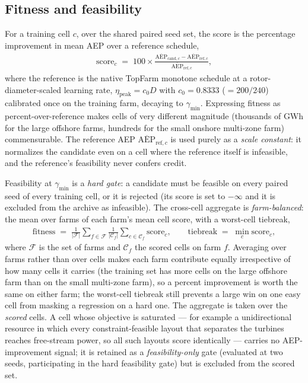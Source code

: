 \documentclass[11pt]{article}
\newcommand{\gm}{\gamma_{\min}}
\newcommand{\aep}{\mathrm{AEP}}
\begin{document}
\subsection{Fitness and feasibility}
\label{sec:fitness}
For a training cell $c$, over the shared paired seed set, the score is the percentage
improvement in mean AEP over a reference schedule,
\begin{align}
\text{score}_c \;=\; 100\times
\frac{\overline{\aep}_{\text{cand},c}-\overline{\aep}_{\text{ref},c}}{\overline{\aep}_{\text{ref},c}},
\label{eq:score}
\end{align}
where the reference is the native TopFarm monotone schedule at a rotor-diameter-scaled
learning rate, $\eta_{\text{peak}}=c_0 D$ with $c_0=0.8333$ ($=200/240$) calibrated once
on the training farm, decaying to $\gm$. Expressing fitness as percent-over-reference makes cells of
very different magnitude (thousands of GWh for the large offshore farms, hundreds for
the small onshore multi-zone farm) commensurable. The reference AEP
$\overline{\aep}_{\text{ref},c}$ is used purely as a \emph{scale constant}: it
normalizes the candidate even on a cell where the reference itself is infeasible, and
the reference's feasibility never confers credit.

Feasibility at $\gm$ is a \emph{hard gate}: a candidate must be feasible on every
paired seed of every training cell, or it is rejected (its score is set to $-\infty$
and it is excluded from the archive as infeasible). The cross-cell aggregate is
\emph{farm-balanced}: the mean over farms of each farm's mean cell score, with a
worst-cell tiebreak,
\begin{align}
\text{fitness} \;=\;
\frac{1}{|\mathcal{F}|}\sum_{f\in\mathcal{F}}
\frac{1}{|\mathcal{C}_f|}\sum_{c\in\mathcal{C}_f}\text{score}_c,
\qquad
\text{tiebreak} \;=\; \min_{c}\text{score}_c,
\label{eq:agg}
\end{align}
where $\mathcal{F}$ is the set of farms and $\mathcal{C}_f$ the scored cells on farm
$f$. Averaging over farms rather than over cells makes each farm contribute equally
irrespective of how many cells it carries (the training set has more cells on the
large offshore farm than on the small multi-zone farm), so a percent improvement is
worth the same on either farm; the worst-cell tiebreak still prevents a large win on
one easy cell from masking a regression on a hard one. The aggregate is taken over the
\emph{scored} cells. A cell whose objective is saturated --- for example a
unidirectional resource in which every constraint-feasible layout that separates the
turbines reaches free-stream power, so all such layouts score identically --- carries
no AEP-improvement signal; it is retained as a \emph{feasibility-only} gate (evaluated
at two seeds, participating in the hard feasibility gate) but is excluded from the
scored set.
\end{document}
